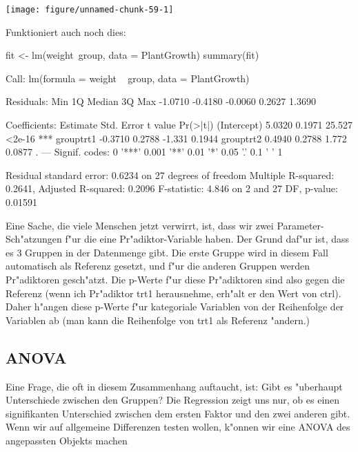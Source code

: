 \documentclass[a4paper,twoside]{tufte-book}\usepackage[]{graphicx}\usepackage[]{color}
\makeatletter
\def\maxwidth{ %
  \ifdim\Gin@nat@width>\linewidth
    \linewidth
  \else
    \Gin@nat@width
  \fi
}
\makeatother
\begin{document}
\begin{appendices}
\begin{Schunk}
\texttt{[image: figure/unnamed-chunk-59-1]} \end{Schunk}

Funktioniert auch noch dies:

\begin{Schunk}
\begin{Sinput}
fit <- lm(weight~group, data = PlantGrowth)
summary(fit)
\end{Sinput}
\begin{Soutput}

Call:
lm(formula = weight ~ group, data = PlantGrowth)

Residuals:
    Min      1Q  Median      3Q     Max 
-1.0710 -0.4180 -0.0060  0.2627  1.3690 

Coefficients:
            Estimate Std. Error t value Pr(>|t|)    
(Intercept)   5.0320     0.1971  25.527   <2e-16 ***
grouptrt1    -0.3710     0.2788  -1.331   0.1944    
grouptrt2     0.4940     0.2788   1.772   0.0877 .  
---
Signif. codes:  0 '***' 0.001 '**' 0.01 '*' 0.05 '.' 0.1 ' ' 1

Residual standard error: 0.6234 on 27 degrees of freedom
Multiple R-squared:  0.2641,	Adjusted R-squared:  0.2096 
F-statistic: 4.846 on 2 and 27 DF,  p-value: 0.01591
\end{Soutput}
\end{Schunk}

Eine Sache, die viele Menschen jetzt verwirrt, ist, dass wir zwei Parameter-Sch"atzungen f"ur die eine Pr"adiktor-Variable haben. Der Grund daf"ur ist, dass es 3 Gruppen in der Datenmenge gibt. Die erste Gruppe wird in diesem Fall automatisch als Referenz gesetzt, und f"ur die anderen Gruppen werden Pr"adiktoren gesch"atzt. Die p-Werte f"ur diese Pr"adiktoren sind also gegen die Referenz (wenn ich Pr"adiktor trt1 herausnehme, erh"alt er den Wert von ctrl). Daher h"angen diese p-Werte f"ur kategoriale Variablen von der Reihenfolge der Variablen ab (man kann die Reihenfolge von trt1 als Referenz "andern.)


\subsection{ANOVA}

Eine Frage, die oft in diesem Zusammenhang auftaucht, ist: Gibt es "uberhaupt Unterschiede zwischen den Gruppen? Die Regression zeigt uns nur, ob es einen signifikanten Unterschied zwischen dem ersten Faktor und den zwei anderen gibt. Wenn wir auf allgemeine Differenzen testen wollen, k"onnen wir eine ANOVA des angepassten Objekts machen


\end{appendices}
\end{document}
